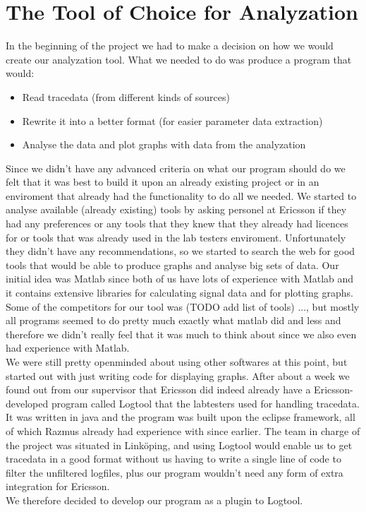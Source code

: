 \documentclass[cropmarks, frame, english]{idamasterthesis}
\begin{document}
\section{The Tool of Choice for Analyzation}
In the beginning of the project we had to make a decision on how we would create our analyzation tool.
What we needed to do was produce a program that would:
\begin{itemize}
\item Read tracedata (from different kinds of sources)
\item Rewrite it into a better format (for easier parameter data extraction)
\item  Analyse the data and plot graphs with data from the analyzation
\end{itemize} 
Since we didn't have any advanced criteria on what our program should do we felt that it was best to build it upon an already existing project or in an enviroment that already had the functionality to do all we needed. \newline
We started to analyse available (already existing) tools by asking personel at Ericsson if they had any preferences or any tools that they knew that they already had licences for or tools that was already used in the lab testers enviroment. Unfortunately they didn't have any recommendations, so we started to search the web for good tools that would be able to produce graphs and analyse big sets of data. Our initial idea was Matlab since both of us have lots of experience with Matlab and it contains extensive libraries for calculating signal data and for plotting graphs. Some of the competitors for our tool was (TODO add list of tools) ..., but mostly all programs seemed to do pretty much exactly what matlab did and less and therefore we didn't really feel that it was much to think about since we also even had experience with Matlab. \\
We were still pretty openminded about using other softwares at this point, but started out with just writing code for displaying graphs. After about a week we found out from our supervisor that Ericsson did indeed already have a Ericsson-developed program called Logtool that the labtesters used for handling tracedata. It was written in java and the program was built upon the eclipse framework, all of which Razmus already had experience with since earlier. The team in charge of the project was situated in Linköping, and using Logtool would enable us to get tracedata in a good format without us having to write a single line of code to filter the unfiltered logfiles, plus our program wouldn't need any form of extra integration for Ericsson.\\
 We therefore decided to develop our program as a plugin to Logtool. 
\end{document}
